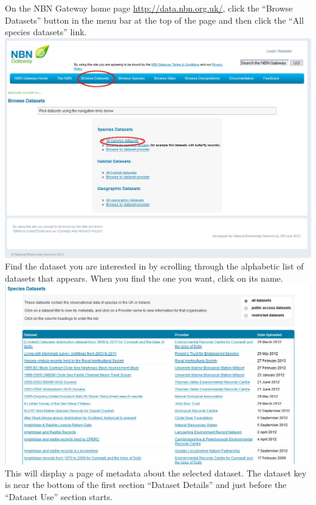 \documentclass{article}
\begin{document}
On the NBN Gateway home page \url{http://data.nbn.org.uk/}, click the
``Browse Datasets'' button in the menu bar at the top of the page and then
click the ``All species datasets'' link.
\\[20pt]  
\includegraphics[width=1\textwidth]{NBN_datasets.png}
\\[12pt]
Find the dataset you are interested in by scrolling through the 
alphabetic list of datasets that appears. When you find the one you want,
click on its name.
\\[20pt]
\includegraphics[width=1\textwidth]{NBN_datasets_list.png}
\\[12pt]
This will display a page of metadata about the selected dataset. The
dataset key is near the bottom of the first section ``Dataset Details''
and just before the ``Dataset Use'' section starts.
\\[20pt]
\end{document}
